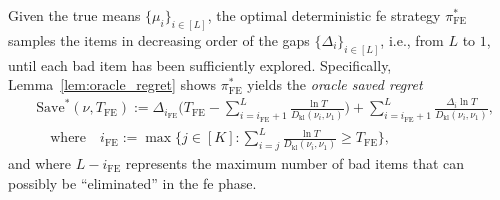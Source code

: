 \documentclass[twoside,11pt]{article}
\newcommand{\kl}{D_{\mathrm{kl}}}
\newcommand{\Tfe}{T_{\mathrm{FE}}}
\newcommand{\Saved}{\mathrm{Save}}
\newcommand{\ife}{i_{\mathrm{FE}}}
\newcommand{\FE}{\textrm{FE}}
\begin{document}
Given  the true means $\{\mu_i\}_{i\in[L]}$, the optimal deterministic \ac{fe} strategy $\pi_{\FE}^*$ samples the items in   decreasing order of the gaps $\{\Delta_i\}_{i\in[L]}$, i.e., from $L$ to $1$, until each bad item has been sufficiently explored. Specifically, 
Lemma~\ref{lem:oracle_regret} shows
$\pi_{\FE}^*$ yields the \emph{oracle  saved regret}  
\begin{align}
    &\Saved^*(\nu,\Tfe) :=\Delta_{\ife} \bigg(\Tfe - \sum_{i=\ife+1}^L \frac{\ln T}{\kl(\nu_i,\nu_1)}\bigg) 
    +
    \sum_{i=\ife+1}^L \frac{\Delta_{i}\ln T}{\kl(\nu_i,\nu_1)}, \label{equ:oracle_regret}
    \\
    &\quad\mbox{where}\quad
    \ife := \max\bigg\{j \in [K]: \sum_{i=j}^L \frac{\ln T }{\kl(\nu_i,\nu_1)}\geq \Tfe\bigg\},
\end{align}
and where $L-\ife$ represents the maximum number of bad items that can possibly be ``eliminated'' in the \ac{fe} phase. 
\end{document}
